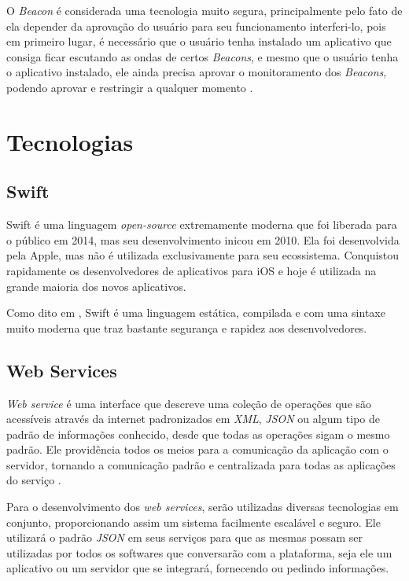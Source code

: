 \documentclass[
	12pt,
	oneside,
	a4paper,
	english,
	brazil,
]{abntex2}
\begin{document}
O \emph{Beacon} é considerada uma tecnologia muito segura, principalmente pelo fato de ela depender da aprovação do usuário para seu funcionamento interferi-lo, pois em primeiro lugar, é necessário que o usuário tenha instalado um aplicativo que consiga ficar escutando as ondas de certos \emph{Beacons}, e mesmo que o usuário tenha o aplicativo instalado, ele ainda precisa aprovar o monitoramento dos \emph{Beacons}, podendo aprovar e restringir a qualquer momento \cite{beacon-what-is-it-forbes}.

\section{Tecnologias}

\subsection{Swift}

Swift é uma linguagem \emph{open-source} extremamente moderna que foi liberada para o público em 2014, mas seu desenvolvimento inicou em 2010. Ela foi desenvolvida pela Apple, mas não é utilizada exclusivamente para seu ecossistema. Conquistou rapidamente os desenvolvedores de aplicativos para iOS e hoje é utilizada na grande maioria dos novos aplicativos.

Como dito em \cite{swift-about}, Swift é uma linguagem estática, compilada e com uma sintaxe muito moderna que traz bastante segurança e rapidez aos desenvolvedores.

\subsection{Web Services}

\emph{Web service} é uma interface que descreve uma coleção de operações que são acessíveis através da internet padronizados em \emph{XML}, \emph{JSON} ou algum tipo de padrão de informações conhecido, desde que todas as operações sigam o mesmo padrão. Ele providência todos os meios para a comunicação da aplicação com o servidor, tornando a comunicação padrão e centralizada para todas as aplicações do serviço \cite{introduction-web-services}.

Para o desenvolvimento dos \emph{web services}, serão utilizadas diversas tecnologias em conjunto, proporcionando assim um sistema facilmente escalável e seguro. Ele utilizará o padrão \emph{JSON} em seus serviços para que as mesmas possam ser utilizadas por todos os softwares que conversarão com a plataforma, seja ele um aplicativo ou um servidor que se integrará, fornecendo ou pedindo informações.
\end{document}
